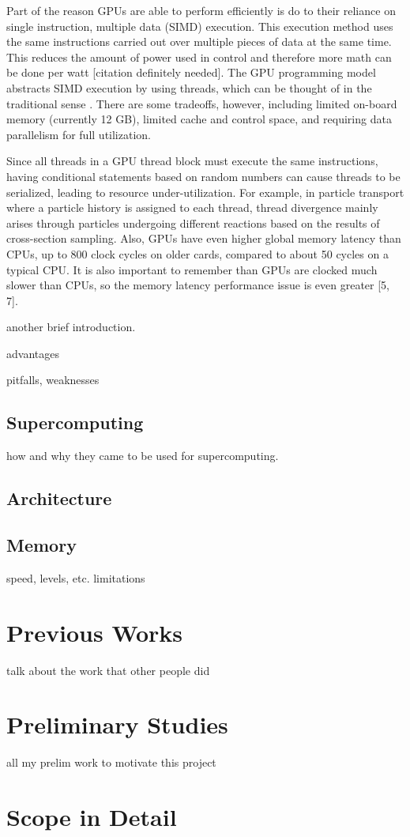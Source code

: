 Part of the reason GPUs are able to perform efficiently is do to their reliance on single instruction, multiple data (SIMD) execution.  This execution method uses the same instructions carried out over multiple pieces of data at the same time.  This reduces the amount of power used in control and therefore more math can be done per watt [citation definitely needed].  The GPU programming model abstracts SIMD execution by using threads, which can be thought of in the traditional sense . There are some tradeoffs, however, including limited on-board memory (currently 12 GB), limited cache and control space, and requiring data parallelism for full utilization.

Since all threads in a GPU thread block must execute the same instructions, having conditional statements based on random numbers can cause threads to be serialized, leading to resource under-utilization.  For example, in particle transport where a particle history is assigned to each thread, thread divergence mainly arises through particles undergoing different reactions based on the results of cross-section sampling.  Also, GPUs have even higher global memory latency than CPUs, up to 800 clock cycles on older cards, compared to about 50 cycles on a typical CPU.  It is also important to remember than GPUs are clocked much slower than CPUs, so the memory latency performance issue is even greater [5, 7]. 

another brief introduction.  

advantages

pitfalls, weaknesses

\subsection{Supercomputing}

how and why they came to be used for supercomputing.

\subsection{Architecture}

\subsection{Memory}

speed, levels, etc.  limitations 


\section{Previous Works}

talk about the work that other people did

\section{Preliminary Studies}

all my prelim work to motivate this project



\section{Scope in Detail}


